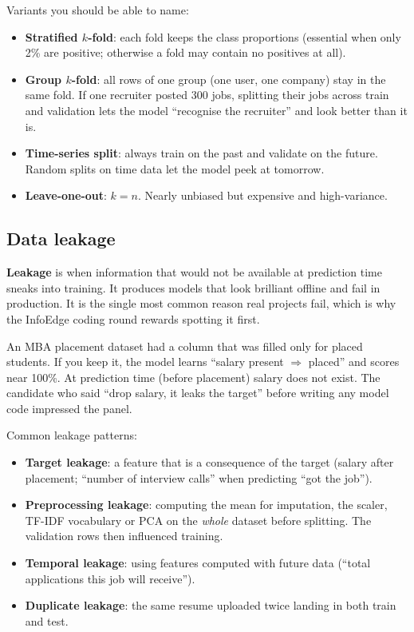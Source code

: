 Variants you should be able to name:
\begin{itemize}
\item \textbf{Stratified $k$-fold}: each fold keeps the class proportions (essential when only 2\% are
  positive; otherwise a fold may contain no positives at all).
\item \textbf{Group $k$-fold}: all rows of one group (one user, one company) stay in the same fold.
  If one recruiter posted 300 jobs, splitting their jobs across train and validation lets the model
  ``recognise the recruiter'' and look better than it is.
\item \textbf{Time-series split}: always train on the past and validate on the future. Random splits on
  time data let the model peek at tomorrow.
\item \textbf{Leave-one-out}: $k = n$. Nearly unbiased but expensive and high-variance.
\end{itemize}

\subsection{Data leakage}
\textbf{Leakage} is when information that would not be available at prediction time sneaks into
training. It produces models that look brilliant offline and fail in production. It is the single most
common reason real projects fail, which is why the InfoEdge coding round rewards spotting it first.

\begin{practical}
An MBA placement dataset had a  column that was filled only for placed students. If you keep it,
the model learns ``salary present $\Rightarrow$ placed'' and scores near 100\%. At prediction time (before
placement) salary does not exist. The candidate who said ``drop salary, it leaks the target'' before writing
any model code impressed the panel.
\end{practical}

Common leakage patterns:
\begin{itemize}
\item \textbf{Target leakage}: a feature that is a consequence of the target (salary after placement;
  ``number of interview calls'' when predicting ``got the job'').
\item \textbf{Preprocessing leakage}: computing the mean for imputation, the scaler, TF-IDF vocabulary or
  PCA on the \emph{whole} dataset before splitting. The validation rows then influenced training.
\item \textbf{Temporal leakage}: using features computed with future data (``total applications this job
  will receive'').
\item \textbf{Duplicate leakage}: the same resume uploaded twice landing in both train and test.
\end{itemize}

